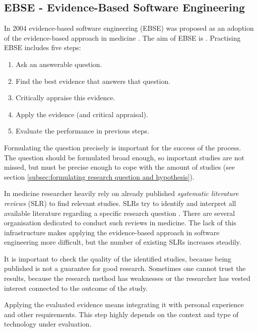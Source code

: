 
\subsection{EBSE - Evidence-Based Software Engineering}
\label{subsec:EBSE}

In 2004 evidence-based software engineering (EBSE) was proposed as an adoption of the evidence-based approach in medicine \cite{EBSE}. The aim of EBSE is  \cite{Dyba2005}. Practising EBSE includes five steps:
\begin{enumerate}
	\item Ask an answerable question.
	\item Find the best evidence that answers that question.
	\item Critically appraise this evidence.
	\item Apply the evidence (and critical appraisal).
	\item Evaluate the performance in previous steps.
\end{enumerate}
Formulating the question precisely is important for the success of the process. The question should be formulated broad enough, so important studies are not missed, but must be precise enough to cope with the amount of studies (see section \ref{subsec:formulating research question and hypothesis}).

In medicine researcher heavily rely on already published \emph{systematic literature reviews} (SLR) to find relevant studies. SLRs try to identify and interpret all available literature regarding a specific research question \cite{keele2007}. There are several organisation dedicated to conduct such reviews in medicine. The lack of this infrastructure makes applying the evidence-based approach in software engineering more difficult, but the number of existing SLRs increases steadily.

It is important to check the quality of the identified studies, because being published is not a guarantee for good research. Sometimes one cannot trust the results, because the research method has weaknesses or the researcher has vested interest connected to the outcome of the study.

Applying the evaluated evidence means integrating it with personal experience and other requirements. This step highly depends on the context and type of technology under evaluation.

